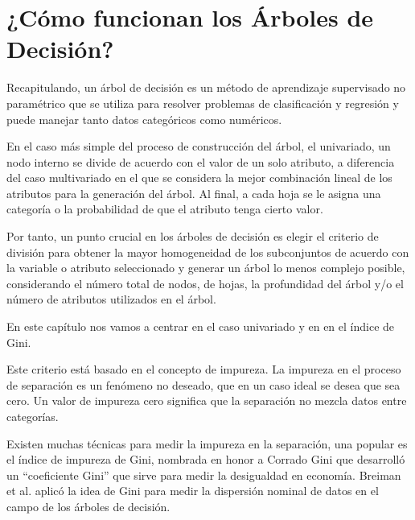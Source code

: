 \documentclass[
10pt, %
a4paper, %
]{article}
\begin{document}

\section{¿Cómo funcionan los Árboles de Decisión?}

Recapitulando, un árbol de decisión es un método de aprendizaje supervisado no paramétrico que se utiliza para resolver problemas de clasificación y regresión y puede 
manejar tanto datos categóricos como numéricos.

En el caso más simple del proceso de construcción del árbol, el univariado, un nodo interno se divide de acuerdo con el valor de un solo atributo, a diferencia del caso
multivariado en el que se considera la mejor combinación lineal de los atributos para la generación del árbol. Al final, a cada hoja se le asigna una categoría o la 
probabilidad de que el atributo tenga cierto valor. 

Por tanto, un punto crucial en los árboles de decisión es elegir el criterio de división para obtener la mayor homogeneidad de los subconjuntos de acuerdo con la variable 
o atributo seleccionado y generar un árbol lo menos complejo posible, considerando el número total de nodos, de hojas, la profundidad del árbol y/o el número de atributos
utilizados en el árbol.

En este capítulo nos vamos a centrar en el caso univariado y en en el índice de Gini.

Este criterio está basado en el concepto de impureza. La impureza en el proceso de separación es un fenómeno no deseado, que en un caso ideal se desea que sea cero. Un valor 
de impureza cero significa que la separación no mezcla datos entre categorías.

Existen muchas técnicas para medir la impureza en la separación, una popular es el índice de impureza de Gini\cite{unpingco}\cite{rokach}, nombrada en honor a Corrado Gini
que desarrolló un ``coeficiente Gini'' que sirve para medir la desigualdad en economía. Breiman et al.\cite{breiman2017classification} aplicó la idea de Gini para medir la
dispersión nominal de datos en el campo de los árboles de decisión.
\end{document}
